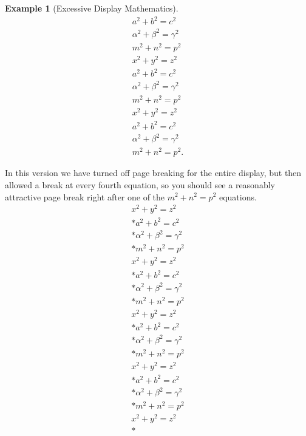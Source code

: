 \documentclass{amsart}
\theoremstyle{plain}%
\theoremstyle{definition}%
\newtheorem{example}[theorem]{Example}
\theoremstyle{remark}%
\numberwithin{equation}{section}
\begin{document}
\begin{example}[Excessive Display Mathematics]
\begin{gather*}
a^2+b^2=c^2\\
\alpha^2+\beta^2=\gamma^2\\
m^2+n^2=p^2\\
x^2+y^2=z^2\\
a^2+b^2=c^2\\
\alpha^2+\beta^2=\gamma^2\\
m^2+n^2=p^2\\
x^2+y^2=z^2\\
a^2+b^2=c^2\\
\alpha^2+\beta^2=\gamma^2\\
m^2+n^2=p^2\text{.}
\end{gather*}
%
\par
In this version we have turned off page breaking for the entire display, but then allowed a break at every fourth equation, so you should see a reasonably attractive page break right after one of the \(m^2+n^2=p^2\) equations.%
\begin{gather}
x^2+y^2=z^2\label{section-mathematics-4-10-3-2-1}\\*
a^2+b^2=c^2\label{section-mathematics-4-10-3-2-2}\\*
\alpha^2+\beta^2=\gamma^2\label{section-mathematics-4-10-3-2-3}\\*
m^2+n^2=p^2\label{section-mathematics-4-10-3-2-4}\\
x^2+y^2=z^2\label{section-mathematics-4-10-3-2-5}\\*
a^2+b^2=c^2\label{section-mathematics-4-10-3-2-6}\\*
\alpha^2+\beta^2=\gamma^2\label{section-mathematics-4-10-3-2-7}\\*
m^2+n^2=p^2\label{section-mathematics-4-10-3-2-8}\\
x^2+y^2=z^2\label{section-mathematics-4-10-3-2-9}\\*
a^2+b^2=c^2\label{section-mathematics-4-10-3-2-10}\\*
\alpha^2+\beta^2=\gamma^2\label{section-mathematics-4-10-3-2-11}\\*
m^2+n^2=p^2\label{section-mathematics-4-10-3-2-12}\\
x^2+y^2=z^2\label{section-mathematics-4-10-3-2-13}\\*
a^2+b^2=c^2\label{section-mathematics-4-10-3-2-14}\\*
\alpha^2+\beta^2=\gamma^2\label{section-mathematics-4-10-3-2-15}\\*
m^2+n^2=p^2\label{section-mathematics-4-10-3-2-16}\\
x^2+y^2=z^2\label{section-mathematics-4-10-3-2-17}\\*

\end{gather}
\end{example}
\end{document}
